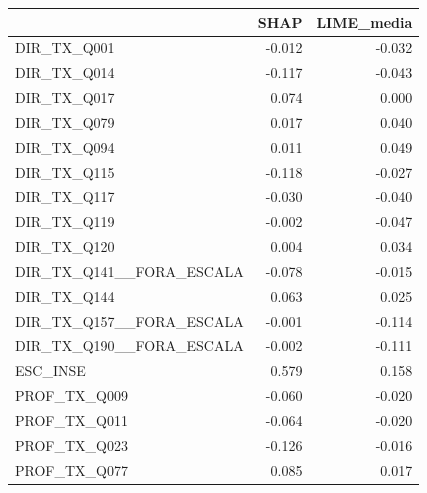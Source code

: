 \begin{tabular}{lrr}
\toprule
 & SHAP & LIME\_media \\
\midrule
DIR\_TX\_Q001 & -0.012 & -0.032 \\
DIR\_TX\_Q014 & -0.117 & -0.043 \\
DIR\_TX\_Q017 & 0.074 & 0.000 \\
DIR\_TX\_Q079 & 0.017 & 0.040 \\
DIR\_TX\_Q094 & 0.011 & 0.049 \\
DIR\_TX\_Q115 & -0.118 & -0.027 \\
DIR\_TX\_Q117 & -0.030 & -0.040 \\
DIR\_TX\_Q119 & -0.002 & -0.047 \\
DIR\_TX\_Q120 & 0.004 & 0.034 \\
DIR\_TX\_Q141\_\_FORA\_ESCALA & -0.078 & -0.015 \\
DIR\_TX\_Q144 & 0.063 & 0.025 \\
DIR\_TX\_Q157\_\_FORA\_ESCALA & -0.001 & -0.114 \\
DIR\_TX\_Q190\_\_FORA\_ESCALA & -0.002 & -0.111 \\
ESC\_INSE & 0.579 & 0.158 \\
PROF\_TX\_Q009 & -0.060 & -0.020 \\
PROF\_TX\_Q011 & -0.064 & -0.020 \\
PROF\_TX\_Q023 & -0.126 & -0.016 \\
PROF\_TX\_Q077 & 0.085 & 0.017 \\
\bottomrule
\end{tabular}
